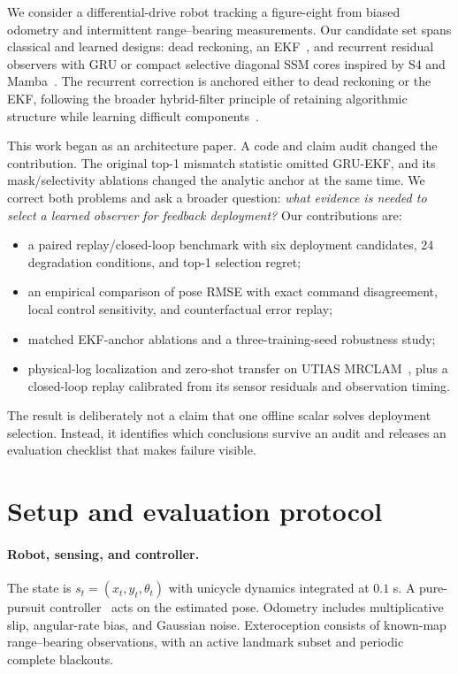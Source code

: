 \documentclass{article}
\begin{document}
We consider a differential-drive robot tracking a figure-eight from biased odometry and intermittent range--bearing measurements. Our candidate set spans classical and learned designs: dead reckoning, an EKF~\citep{thrun2005probabilistic}, and recurrent residual observers with GRU or compact selective diagonal SSM cores inspired by S4 and Mamba~\citep{gu2022s4,gu2024mamba}. The recurrent correction is anchored either to dead reckoning or the EKF, following the broader hybrid-filter principle of retaining algorithmic structure while learning difficult components~\citep{becker2019rkn,jonschkowski2018dpf,revach2022kalmannet}.

This work began as an architecture paper. A code and claim audit changed the contribution. The original top-1 mismatch statistic omitted GRU-EKF, and its mask/selectivity ablations changed the analytic anchor at the same time. We correct both problems and ask a broader question: \emph{what evidence is needed to select a learned observer for feedback deployment?} Our contributions are:
\begin{itemize}
\item a paired replay/closed-loop benchmark with six deployment candidates, 24 degradation conditions, and top-1 selection regret;
\item an empirical comparison of pose RMSE with exact command disagreement, local control sensitivity, and counterfactual error replay;
\item matched EKF-anchor ablations and a three-training-seed robustness study;
\item physical-log localization and zero-shot transfer on UTIAS MRCLAM~\citep{leung2011utias}, plus a closed-loop replay calibrated from its sensor residuals and observation timing.
\end{itemize}
The result is deliberately not a claim that one offline scalar solves deployment selection. Instead, it identifies which conclusions survive an audit and releases an evaluation checklist that makes failure visible.

\section{Setup and evaluation protocol}
\paragraph{Robot, sensing, and controller.}
The state is $s_t=(x_t,y_t,\theta_t)$ with unicycle dynamics integrated at $0.1$ s. A pure-pursuit controller~\citep{coulter1992pure} acts on the estimated pose. Odometry includes multiplicative slip, angular-rate bias, and Gaussian noise. Exteroception consists of known-map range--bearing observations, with an active landmark subset and periodic complete blackouts.
\end{document}

